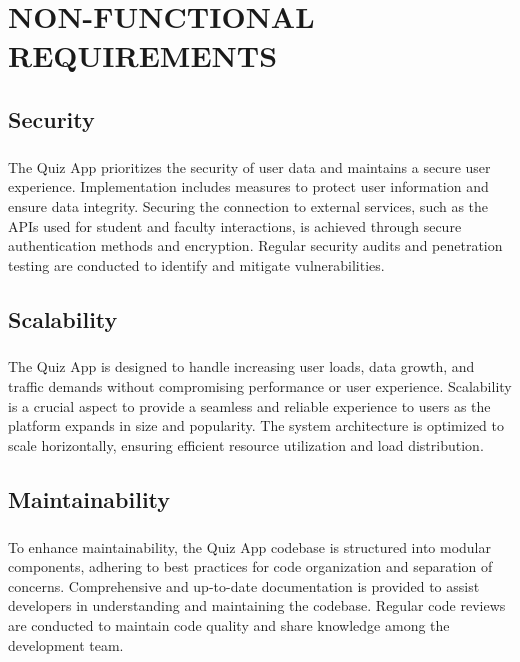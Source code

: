 \chapter{NON-FUNCTIONAL REQUIREMENTS}

\raggedright

\section{Security}
\large{\paragraph{}
The Quiz App prioritizes the security of user data and maintains a secure user experience. Implementation includes measures to protect user information and ensure data integrity. Securing the connection to external services, such as the APIs used for student and faculty interactions, is achieved through secure authentication methods and encryption. Regular security audits and penetration testing are conducted to identify and mitigate vulnerabilities.}

\section{Scalability}
\large{\paragraph{}
The Quiz App is designed to handle increasing user loads, data growth, and traffic demands without compromising performance or user experience. Scalability is a crucial aspect to provide a seamless and reliable experience to users as the platform expands in size and popularity. The system architecture is optimized to scale horizontally, ensuring efficient resource utilization and load distribution.}

\section{Maintainability}
\large{\paragraph{}
To enhance maintainability, the Quiz App codebase is structured into modular components, adhering to best practices for code organization and separation of concerns. Comprehensive and up-to-date documentation is provided to assist developers in understanding and maintaining the codebase. Regular code reviews are conducted to maintain code quality and share knowledge among the development team.}

